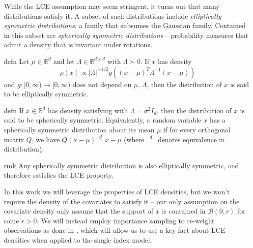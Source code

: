 \documentclass[11pt]{article}
\begin{document}
While the LCE assumption may seem stringent, it turns out that many distributions satisfy it. A subset of such distributions include \textit{elliptically symmetric distributions}, a family that subsumes the Gaussian family. Contained in this subset are \textit{spherically symmetric distributions} -- probability measures that admit a density that is invariant under rotations.

\begin{restatable}{defn}{}\label{def: elliptical symmetry}
Let $\mu \in \mathbb{R}^d$ and let $\Lambda \in \mathbb{R}^{d\times d}$ with $\Lambda \succ 0$. If $x$ has density
\begin{equation}
     \rho(x) \propto |\Lambda|^{-1/2}g\left((x-\mu)^{T}\Lambda^{-1}(x - \mu)\right)
\end{equation}
and $g:[0, \infty) \rightarrow[0, \infty)$ does not depend on $\mu$, $\Lambda$, then the distribution of $x$ is said to be elliptically symmetric. 
\end{restatable}

\begin{restatable}{defn}{}\label{def: spherical symmetry}
If $x\in \mathbb{R}^d$ has density satisfying  with $\Lambda = \sigma^2I_d$, then the distribution of $x$ is said to be spherically symmetric. Equivalently, a random variable $x$ has a spherically symmetric distribution about its mean $\mu$ if for every orthogonal matrix $Q$, we have $Q(x - \mu) \overset{d}{=} x - \mu$ (where $\overset{d}{=}$ denotes equivalence in distribution). 
\end{restatable}


\begin{restatable}{rmk}{}
    Any spherically symmetric distribution is also elliptically symmetric, and therefore satisfies the LCE property. 
\end{restatable}

In this work we will leverage the properties of LCE densities, but we won't require the density of the covariates to satisfy it -- our only assumption on the covariate density only assume that the support of $x$ is contained in $\mathcal{B}(0, r)$ for some $r > 0$. We will instead employ importance sampling to re-weight observations as done in \citet{Newey_Ruud_2005}, which will allow us to use a key fact about LCE densities when applied to the single index model.
\end{document}
